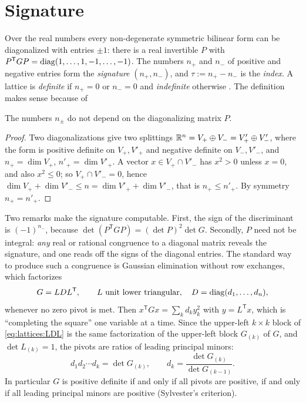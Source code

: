 \section{Signature}\label{sec:lattices:signature}

Over the real numbers every non-degenerate symmetric bilinear form can be diagonalized with
entries $\pm1$: there is a real invertible $P$ with
$P^{\mathsf T}GP=\operatorname{diag}(1,\dots,1,-1,\dots,-1)$. The numbers $n_+$ and $n_-$ of positive and
negative entries form the \emph{signature} $(n_+,n_-)$, and
$\tau:=n_+-n_-$ is the \emph{index}. A lattice is \emph{definite} if $n_+=0$ or $n_-=0$ and
\emph{indefinite} otherwise .
The definition makes sense because of

\begin{theorem}\label{thm:lattices:sylvester}
The numbers $n_\pm$ do not depend on the diagonalizing matrix $P$.
\end{theorem}
\begin{proof}
Two diagonalizations give two splittings $\mathbb{R}^n=V_+\oplus V_-=V'_+\oplus V'_-$, where the
form is positive definite on $V_+,V'_+$ and negative definite on $V_-,V'_-$, and
$n_+=\dim V_+$, $n'_+=\dim V'_+$. A vector $x\in V_+\cap V'_-$ has $x^2>0$ unless $x=0$, and
also $x^2\le0$; so $V_+\cap V'_-=0$, hence $\dim V_++\dim V'_-\le n=\dim V'_++\dim V'_-$,
that is $n_+\le n'_+$. By symmetry $n_+=n'_+$.
\end{proof}

Two remarks make the signature computable. First, the sign of the discriminant is
$(-1)^{n_-}$, because $\det(P^{\mathsf T}GP)=(\det P)^2\det G$. Secondly, $P$ need not be
integral: \emph{any} real or rational congruence to a diagonal matrix reveals the signature,
and one reads off the signs of the diagonal entries. The standard way to produce such a
congruence is Gaussian elimination without row exchanges, which factorizes
\begin{equation}\label{eq:lattices:LDL}
 G=LDL^{\mathsf T},\qquad L\ \text{unit lower triangular},\quad D=\operatorname{diag}(d_1,\dots,d_n),
\end{equation}
whenever no zero pivot is met. Then $x^{\mathsf T}Gx=\sum_kd_ky_k^2$ with $y=L^{\mathsf T}x$,
which is ``completing the square'' one variable at a time. Since the upper-left $k\times k$
block of \eqref{eq:lattices:LDL} is the same factorization of the upper-left block $G_{(k)}$
of $G$, and $\det L_{(k)}=1$, the pivots are ratios of leading principal minors:
\begin{equation}\label{eq:lattices:pivots}
 d_1d_2\cdots d_k=\det G_{(k)},\qquad d_k=\frac{\det G_{(k)}}{\det G_{(k-1)}} .
\end{equation}
In particular $G$ is positive definite if and only if all pivots are positive, if and only
if all leading principal minors are positive (Sylvester's criterion).

